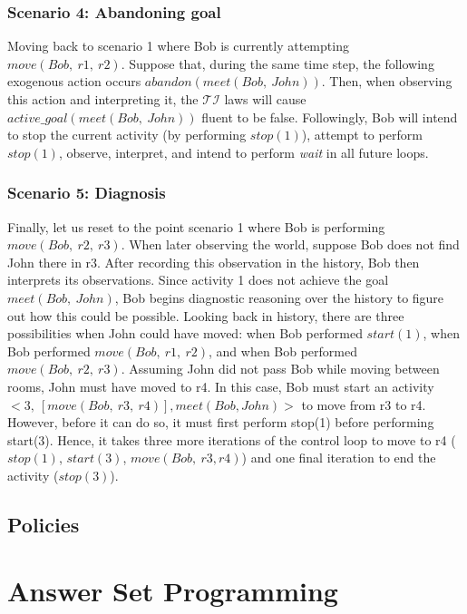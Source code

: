 \subsubsection{Scenario 4: Abandoning goal~\cite{blount_towards_2014}}
\label{subsubsec:aia_scenario_4}

Moving back to scenario 1 where Bob is currently attempting $move(Bob,\ r1,\ r2)$.
Suppose that, during the same time step, the following exogenous action occurs $abandon(meet(Bob,\ John))$.
Then, when observing this action and interpreting it, the $\mathcal{TI}$ laws will cause $active\_goal(meet(Bob,\ John))$ fluent to be false.
Followingly, Bob will intend to stop the current activity (by performing $stop(1)$), attempt to perform $stop(1)$, observe, interpret, and intend to perform \textit{wait} in all future loops.

\subsubsection{Scenario 5: Diagnosis~\cite{blount_towards_2014}}
\label{subsubsec:aia_scenario_5}

Finally, let us reset to the point scenario 1 where Bob is performing $move(Bob,\ r2,\ r3)$.
When later observing the world, suppose Bob does not find John there in r3.
After recording this observation in the history, Bob then interprets its observations.
Since activity 1 does not achieve the goal $meet(Bob,\ John)$, Bob begins diagnostic reasoning over the history to figure out how this could be possible.
Looking back in history, there are three possibilities when John could have moved: when Bob performed $start(1)$, when Bob performed $move(Bob,\ r1,\ r2)$, and when Bob performed $move(Bob,\ r2,\ r3)$.
Assuming John did not pass Bob while moving between rooms, John must have moved to r4.
In this case, Bob must start an activity $<3,\ [move(Bob,\ r3,\ r4)],meet(Bob,John)>$ to move from r3 to r4.
However, before it can do so, it must first perform stop(1) before performing start(3).
Hence, it takes three more iterations of the control loop to move to r4 ($stop(1)$, $start(3)$, $move(Bob,\ r3,r4)$) and one final iteration to end the activity ($stop(3)$).

\subsection{Policies}
\label{subsec:policies}

\section{Answer Set Programming}
\label{sec:asp}
